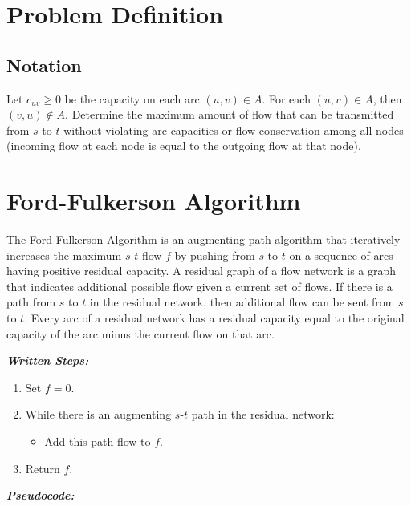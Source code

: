 \documentclass[12pt]{article}
\theoremstyle{definition}
\begin{document}
\vfill

\newpage
\section{Problem Definition}

\subsection{Notation}

Let $c_{uv} \ge 0$ be the capacity on each arc $(u,v) \in A$. For each $(u,v) \in A$, then $(v,u) \notin A$. Determine the maximum amount of flow that can be transmitted from $s$ to $t$ without violating arc capacities or flow conservation among all nodes (incoming flow at each node is equal to the outgoing flow at that node).


\section{Ford-Fulkerson Algorithm}

The Ford-Fulkerson Algorithm is an augmenting-path algorithm that iteratively increases the maximum $s$-$t$ flow $f$ by pushing from $s$ to $t$ on a sequence of arcs having positive residual capacity. A residual graph of a flow network is a graph that indicates additional possible flow given a current set of flows. If there is a path from $s$ to $t$ in the residual network, then additional flow can be sent from $s$ to $t$. Every arc of a residual network has a residual capacity equal to the original capacity of the arc minus the current flow on that arc. 

\emph{\textbf{Written Steps:}}


\begin{enumerate}
	\item Set $f = 0$. 
	\item While there is an augmenting $s$-$t$ path in the residual network:
	\begin{itemize}
		\item Add this path-flow to $f$.
	\end{itemize}
	\item Return $f$.

\end{enumerate}

\emph{\textbf{Pseudocode:}}
\end{document}
